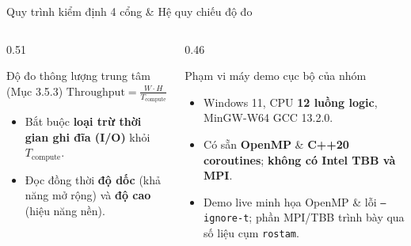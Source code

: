 \documentclass[aspectratio=169,10pt]{beamer}
\newcommand{\code}[1]{\texttt{\color{BlueDark}#1}}
\newcommand{\ok}[1]{\textcolor{OkGreen}{\bfseries #1}}
\newcommand{\bad}[1]{\textcolor{BadRed}{\bfseries #1}}
\begin{document}
\begin{frame}{Quy trình kiểm định 4 cổng \& Hệ quy chiếu độ đo}
\vspace{0.22cm}
\begin{columns}[T,totalwidth=\textwidth]
  \begin{column}{0.51\textwidth}
    \begin{bluebox}[height=3.05cm]{Độ đo thông lượng trung tâm (Mục 3.5.3)}
      \centering
      $\displaystyle \text{Throughput} = \frac{W \cdot H}{T_{\text{compute}}}$ 
      \vspace{3pt}
      \raggedright
      \begin{itemize}\scriptsize\setlength{\itemsep}{2pt}
        \item Bắt buộc \textbf{loại trừ thời gian ghi đĩa (I/O)} khỏi $T_{\text{compute}}$.
        \item Đọc đồng thời \textbf{độ dốc} (khả năng mở rộng) và \textbf{độ cao} (hiệu năng nền).
      \end{itemize}
    \end{bluebox}
  \end{column}
  \begin{column}{0.46\textwidth}
    \begin{hboxcard}[height=3.05cm]{Phạm vi máy demo cục bộ của nhóm}
      \begin{itemize}\scriptsize\setlength{\itemsep}{2.5pt}
        \item Windows 11, CPU \textbf{12 luồng logic}, MinGW-W64 GCC 13.2.0.
        \item Có sẵn \ok{OpenMP} \& \ok{C++20 coroutines}; \bad{không có Intel TBB và MPI}.
        \item Demo live minh họa OpenMP \& lỗi \code{--ignore-t}; phần MPI/TBB trình bày qua số liệu cụm \code{rostam}.
      \end{itemize}
    \end{hboxcard}
  \end{column}
\end{columns}
\end{frame}
\end{document}

